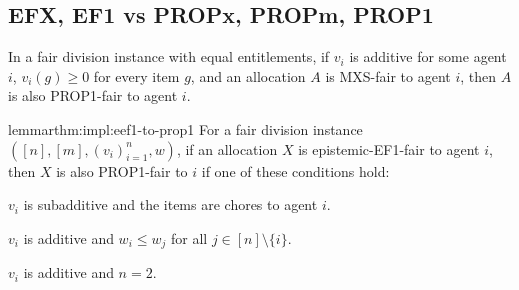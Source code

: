 \subsection{EFX, EF1 vs PROPx, PROPm, PROP1}
\label{sec:impls-extra:efx-ef1-vs-propx-propm-prop1}

\begin{lemma}
\label{thm:impl:mxs-to-prop1}
In a fair division instance with equal entitlements,
if $v_i$ is additive for some agent $i$, $v_i(g) \ge 0$ for every item $g$,
and an allocation $A$ is MXS-fair to agent $i$, then $A$ is also PROP1-fair to agent $i$.
\end{lemma}

\begin{restatable}{lemma}{rthm:impl:eef1-to-prop1}
\label{thm:impl:eef1-to-prop1}
For a fair division instance $([n], [m], (v_i)_{i=1}^n, w)$,
if an allocation $X$ is epistemic-EF1-fair to agent $i$, then $X$ is also PROP1-fair to $i$
if one of these conditions hold:
\begin{tightenum}
\item $v_i$ is subadditive and the items are chores to agent $i$.
\item $v_i$ is additive and $w_i \le w_j$ for all $j \in [n] \setminus \{i\}$.
\item $v_i$ is additive and $n=2$.
\end{tightenum}
\end{restatable}
